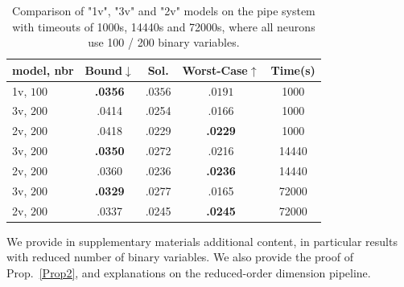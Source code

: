 		
	\begin{table}[h!]
	\begin{tabular}{||l||c|c|c|c||}\hline\hline
		model, nbr&        Bound$\downarrow$ &  Sol. &      Worst-Case$\uparrow$ &  Time(s) \\\hline \hline
		1v, $100$ &     {\bf .0356} &  $.0356$ & $.0191$ &  1000 \\\hline
		3v, $200$&     .0414 &  .0254 &  .0166 &  1000 \\\hline
		2v, $200$&     .0418 &  .0229 &   {\bf .0229} &  1000 \\\hline \hline
		3v, $200$&      {\bf .0350} &  .0272 &  .0216 & 14440 \\\hline
		2v, $200$&     .0360 &  .0236 &    {\bf .0236} & 14440 \\\hline \hline
		3v, $200$&     {\bf .0329} &  .0277 &  .0165 & 72000 \\\hline
		2v, $200$&     .0337 &  .0245 &  {\bf .0245} & 72000 \\\hline\hline
	\end{tabular}
	\caption{Comparison of "1v", "3v" and "2v" models on the pipe system with timeouts of 1000s, 14440s and 72000s, where all neurons use 100 / 200 binary variables.}
	\label{table.pipe}
\end{table}

\newpage

 We provide in supplementary materials additional content, in particular results with reduced number of binary variables. We also provide the proof of Prop.~\ref{Prop2}, and explanations on the reduced-order dimension pipeline.